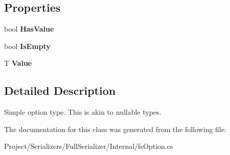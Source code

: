 \subsection*{Properties}
\begin{DoxyCompactItemize}
\item 
\mbox{\label{struct_full_serializer_1_1_internal_1_1fs_option_a8271a12938fbe51299635f1998ee4659}} 
bool {\bfseries Has\+Value}
\item 
\mbox{\label{struct_full_serializer_1_1_internal_1_1fs_option_a751a53374e8c4a4b9727dbf4f1af3f9e}} 
bool {\bfseries Is\+Empty}
\item 
\mbox{\label{struct_full_serializer_1_1_internal_1_1fs_option_a7a047ed8e8e324add654a5c3620a97cd}} 
T {\bfseries Value}
\end{DoxyCompactItemize}


\subsection{Detailed Description}
Simple option type. This is akin to nullable types. 



The documentation for this class was generated from the following file\+:\begin{DoxyCompactItemize}
\item 
Project/\+Serializers/\+Full\+Serializer/\+Internal/fs\+Option.\+cs\end{DoxyCompactItemize}
